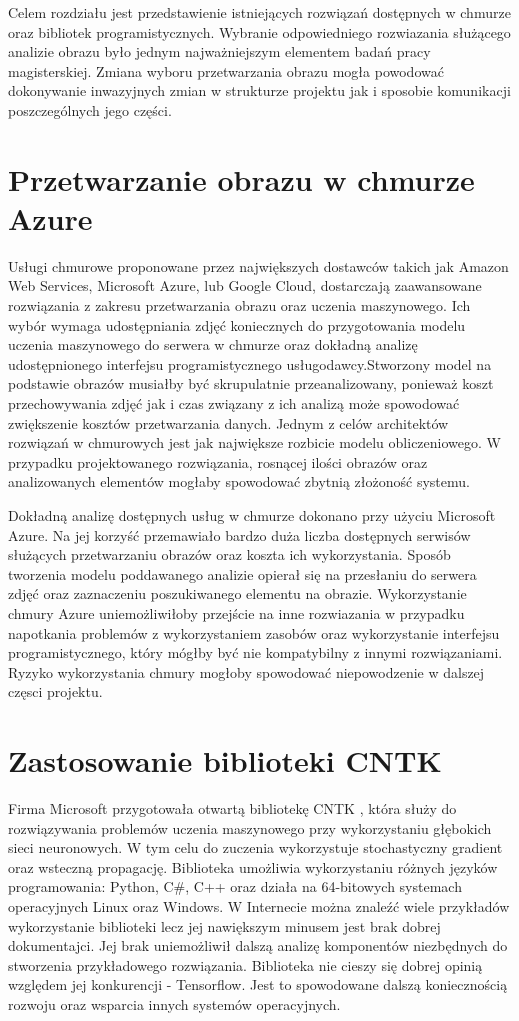 Celem rozdziału jest przedstawienie istniejących rozwiązań dostępnych w chmurze oraz bibliotek programistycznych. Wybranie odpowiedniego rozwiazania służącego analizie obrazu było jednym najważniejszym elementem badań pracy magisterskiej. Zmiana wyboru przetwarzania obrazu mogła powodować dokonywanie inwazyjnych zmian w strukturze projektu jak i sposobie komunikacji poszczególnych jego części. 

\section{Przetwarzanie obrazu w chmurze Azure} {
Usługi chmurowe proponowane przez największych dostawców takich jak Amazon Web Services, Microsoft Azure, lub Google Cloud, dostarczają zaawansowane rozwiązania z zakresu przetwarzania obrazu oraz uczenia maszynowego. Ich wybór wymaga udostępniania zdjęć koniecznych do przygotowania modelu uczenia maszynowego do serwera w chmurze oraz dokładną analizę udostępnionego interfejsu programistycznego usługodawcy.Stworzony model na podstawie obrazów musiałby być skrupulatnie przeanalizowany, ponieważ koszt przechowywania zdjęć jak i czas związany z ich analizą może spowodować zwiększenie kosztów przetwarzania danych. Jednym z celów architektów rozwiązań w chmurowych jest jak największe rozbicie modelu obliczeniowego. W przypadku projektowanego rozwiązania, rosnącej ilości obrazów oraz analizowanych elementów mogłaby spowodować zbytnią złożoność systemu. 

Dokładną analizę dostępnych usług w chmurze dokonano przy użyciu Microsoft Azure. Na jej korzyść przemawiało bardzo duża liczba dostępnych serwisów służących przetwarzaniu obrazów oraz koszta ich wykorzystania. Sposób tworzenia modelu poddawanego analizie opierał się na przesłaniu do serwera zdjęć oraz zaznaczeniu poszukiwanego elementu na obrazie. Wykorzystanie chmury Azure uniemożliwiłoby przejście na inne rozwiazania w przypadku napotkania problemów z wykorzystaniem zasobów oraz wykorzystanie interfejsu programistycznego, który mógłby być nie kompatybilny z innymi rozwiązaniami. Ryzyko wykorzystania chmury mogłoby spowodować niepowodzenie w dalszej częsci projektu. 
}
\section{Zastosowanie biblioteki CNTK}{
Firma Microsoft przygotowała otwartą bibliotekę CNTK \cite{CNTK}, która służy do rozwiązywania problemów uczenia maszynowego przy wykorzystaniu głębokich sieci neuronowych. W tym celu do zuczenia wykorzystuje stochastyczny gradient oraz wsteczną propagację. Biblioteka umożliwia wykorzystaniu różnych języków programowania: Python, C\#, C++ oraz działa na 64-bitowych systemach operacyjnych Linux oraz Windows. W Internecie można znaleźć wiele przykładów wykorzystanie biblioteki lecz jej nawiększym minusem jest brak dobrej dokumentajci. Jej brak uniemożliwił dalszą analizę komponentów niezbędnych do stworzenia przykładowego rozwiązania. Biblioteka nie cieszy się dobrej opinią względem jej konkurencji - Tensorflow. Jest to spowodowane dalszą koniecznością rozwoju oraz wsparcia innych systemów operacyjnych. 
}

